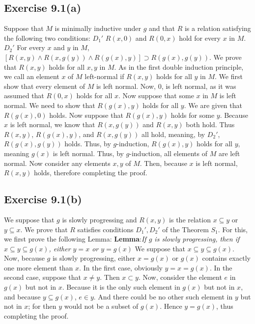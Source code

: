 \documentclass{article}
\theoremstyle{definition}
\begin{document}
\subsection*{Exercise 9.1(a)}
Suppose that $M$ is minimally inductive under $g$ and that $R$ is a relation satisfying the following two conditions:\newline
$D_1'$ $R(x,0)$ and $R(0,x)$ hold for every $x$ in $M$.\newline
$D_2'$ For every $x$ and $y$ in $M$, $[R(x,y)\wedge R(x,g(y))\wedge R(g(x),y)]\supset R(g(x),g(y))$.\newline
We prove that $R(x,y)$ holds for all $x,y$ in $M$. As in the first double induction principle, we call an element $x$ of $M$ left-normal if $R(x,y)$ holds for all $y$ in $M$. 
We first show that every element of $M$ is left normal. Now, $0$, 
is left normal, as it was assumed that $R(0,x)$ holds for all $x$. Now suppose that some $x$ in $M$ is left normal. We need to show that 
$R(g(x),y)$ holds for all $y$. We are given that $R(g(x),0)$ holds. Now suppose that $R(g(x),y)$ holds for some $y$. Because $x$ is left normal, we know that 
$R(x,g(y))$ and $R(x,y)$ both hold. Thus $R(x,y)$, $R(g(x),y)$, and $R(x,g(y))$ all hold, meaning, by $D_2'$, $R(g(x),g(y))$ holds. Thus, by $g$-induction, $R(g(x),y)$ holds for all $y$, meaning 
$g(x)$ is left normal. Thus, by $g$-induction, all elements of $M$ are left normal. Now consider any elements $x,y$ of $M$. Then, because $x$ is left normal, $R(x,y)$ holds, therefore completing 
the proof.

\subsection*{Exercise 9.1(b)}
We suppose that $g$ is slowly progressing and $R(x,y)$ is the relation $x\subseteq y$ or $y\subseteq x$. We prove that $R$ satisfies conditions $D_1',D_2'$ of the Theorem $S_1$. For this, we 
first prove the following Lemma:\newline
\textbf{Lemma}:\textit{If $g$ is slowly progressing, then if $x\subseteq y\subseteq g(x)$, either $y=x$ or $y=g(x)$}\newline
We suppose that $x\subseteq y\subseteq g(x)$. Now, because $g$ is slowly progressing, either $x=g(x)$ or $g(x)$ contains exactly one more element than $x$. In the first case, obviously 
$y=x=g(x)$. In the second case, suppose that $x\ne y$. Then $x\subset y$. Now, consider the element $e$ in $g(x)$ but not in $x$. Because it is the only such element in $g(x)$ but not in $x$, 
and because $y\subseteq g(x)$, $e\in y$. And there could be no other such element in $y$ but not in $x$; for then $y$ would not be a subset of $g(x)$. Hence $y=g(x)$, thus completing the proof.
\end{document}
